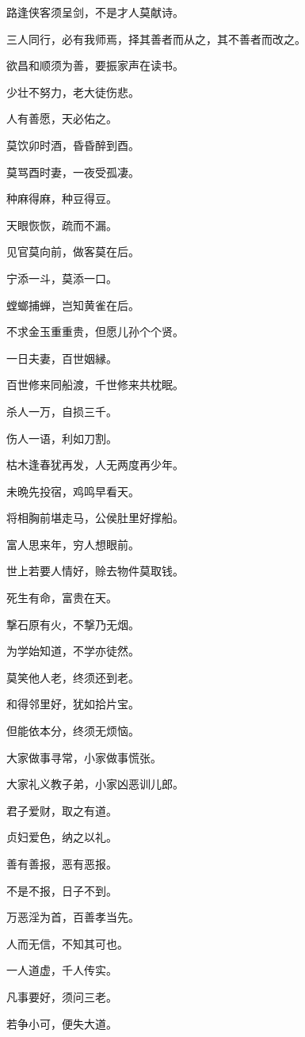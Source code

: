 \documentclass[12pt,oneside]{book}
\begin{document}
路逢侠客须呈剑，不是才人莫献诗。

三人同行，必有我师焉，择其善者而从之，其不善者而改之。

欲昌和顺须为善，要振家声在读书。

少壮不努力，老大徒伤悲。

人有善愿，天必佑之。

莫饮卯时酒，昏昏醉到酉。

莫骂酉时妻，一夜受孤凄。

种麻得麻，种豆得豆。

天眼恢恢，疏而不漏。

见官莫向前，做客莫在后。

宁添一斗，莫添一口。

螳螂捕蝉，岂知黄雀在后。

不求金玉重重贵，但愿儿孙个个贤。

一日夫妻，百世姻縁。

百世修来同船渡，千世修来共枕眠。

杀人一万，自损三千。

伤人一语，利如刀割。

枯木逢春犹再发，人无两度再少年。

未晩先投宿，鸡鸣早看天。

将相胸前堪走马，公侯肚里好撑船。

富人思来年，穷人想眼前。

世上若要人情好，赊去物件莫取钱。

死生有命，富贵在天。

撃石原有火，不撃乃无烟。

为学始知道，不学亦徒然。

莫笑他人老，终须还到老。

和得邻里好，犹如拾片宝。

但能依本分，终须无烦恼。

大家做事寻常，小家做事慌张。

大家礼义教子弟，小家凶恶训儿郎。

君子爱财，取之有道。

贞妇爱色，纳之以礼。

善有善报，恶有恶报。

不是不报，日子不到。

万恶淫为首，百善孝当先。

人而无信，不知其可也。

一人道虚，千人传实。

凡事要好，须问三老。

若争小可，便失大道。
\end{document}
